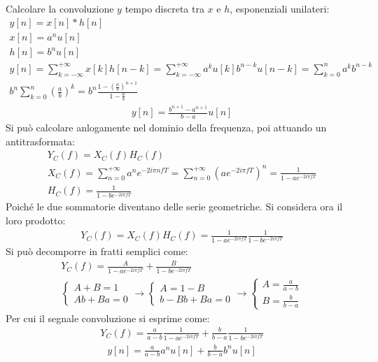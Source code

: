 \documentclass{article}
\begin{document}
Calcolare la convoluzione $y$ tempo discreta tra $x$ e $h$, esponenziali unilateri: 
\begin{gather*}
    y[n]=x[n]*h[n]\\
    x[n]=a^nu[n]\\
    h[n]=b^nu[n]\\
    y[n]=\displaystyle\sum_{k=-\infty}^{+\infty}x[k]h[n-k]=\sum_{k=-\infty}^{+\infty}a^ku[k]b^{n-k}u[n-k]=\sum_{k=0}^na^kb^{n-k}\\
    \displaystyle b^n\sum_{k=0}^n\left(\frac{a}{b}\right)^k=b^n\frac{1-\left(\frac{a}{b}\right)^{n+1}}{1-\frac{a}{b}}
\end{gather*}
\begin{gather}
    y[n]=\displaystyle\frac{b^{n+1}-a^{n+1}}{b-a}u[n]
\end{gather}
Si può calcolare anlogamente nel dominio della frequenza, poi attuando un antitrasformata: 
\begin{gather*}
    Y_C(f)=X_C(f)H_C(f)\\
    X_C(f)=\displaystyle\sum_{n=0}^{+\infty}a^ne^{-2i\pi nfT}=\sum_{n=0}^{+\infty}\left(ae^{-2i\pi fT}\right)^n=\frac{1}{1-ae^{-2i\pi fT}}\\
    H_C(f)=\displaystyle\frac{1}{1-be^{-2i\pi fT}}
\end{gather*}
Poiché le due sommatorie diventano delle serie geometriche. Si considera ora il loro prodotto:
\begin{gather*}
    Y_C(f)=X_C(f)H_C(f)=\displaystyle\frac{1}{1-ae^{-2i\pi fT}}\frac{1}{1-be^{-2i\pi fT}}
\end{gather*}
Si può decomporre in fratti semplici come:
\begin{gather*}
    Y_C(f)=\displaystyle\frac{A}{1-ae^{-2i\pi fT}}+\frac{B}{1-be^{-2i\pi fT}}\\
    \begin{cases}
        A+B=1\\
        Ab+Ba=0
    \end{cases}\to
    \begin{cases}
        A=1-B\\
        b-Bb+Ba=0
    \end{cases}\to\begin{cases}
        A=\displaystyle\frac{a}{a-b}\\
        B=\displaystyle\frac{b}{b-a}
    \end{cases}
\end{gather*}
Per cui il segnale convoluzione si esprime come:
\begin{gather*}
    Y_C(f)=\displaystyle\frac{a}{a-b}\frac{1}{1-ae^{-2i\pi fT}}+\frac{b}{b-a}\frac{1}{1-be^{-2i\pi fT}}
\end{gather*}
\begin{gather}
    y[n]=\displaystyle\frac{a}{a-b}a^nu[n]+\displaystyle\frac{b}{b-a}b^nu[n]
\end{gather}
\end{document}
